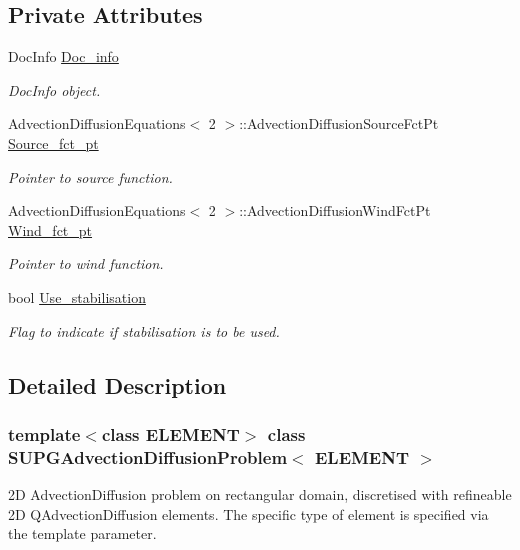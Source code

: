 \subsection*{Private Attributes}
\begin{DoxyCompactItemize}
\item 
Doc\+Info \hyperlink{classSUPGAdvectionDiffusionProblem_af80606875e03033c0de217f7a861d0af}{Doc\+\_\+info}
\begin{DoxyCompactList}\small\item\em Doc\+Info object. \end{DoxyCompactList}\item 
Advection\+Diffusion\+Equations$<$ 2 $>$\+::Advection\+Diffusion\+Source\+Fct\+Pt \hyperlink{classSUPGAdvectionDiffusionProblem_a9bf04de8641dd4151514c2e2603f3ac5}{Source\+\_\+fct\+\_\+pt}
\begin{DoxyCompactList}\small\item\em Pointer to source function. \end{DoxyCompactList}\item 
Advection\+Diffusion\+Equations$<$ 2 $>$\+::Advection\+Diffusion\+Wind\+Fct\+Pt \hyperlink{classSUPGAdvectionDiffusionProblem_a89bc22484946ccf51bb7cf7328bc9df6}{Wind\+\_\+fct\+\_\+pt}
\begin{DoxyCompactList}\small\item\em Pointer to wind function. \end{DoxyCompactList}\item 
bool \hyperlink{classSUPGAdvectionDiffusionProblem_ab8c19428c17ac7d8bb776e91940734bd}{Use\+\_\+stabilisation}
\begin{DoxyCompactList}\small\item\em Flag to indicate if stabilisation is to be used. \end{DoxyCompactList}\end{DoxyCompactItemize}


\subsection{Detailed Description}
\subsubsection*{template$<$class E\+L\+E\+M\+E\+NT$>$\newline
class S\+U\+P\+G\+Advection\+Diffusion\+Problem$<$ E\+L\+E\+M\+E\+N\+T $>$}

2D Advection\+Diffusion problem on rectangular domain, discretised with refineable 2D Q\+Advection\+Diffusion elements. The specific type of element is specified via the template parameter. 

